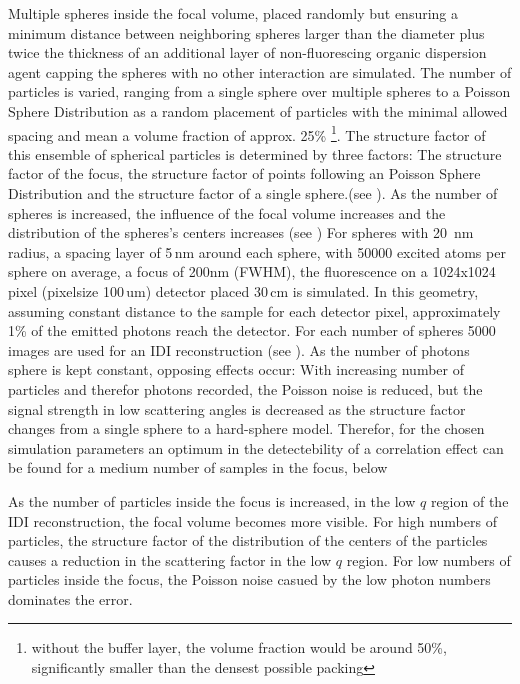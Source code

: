 Multiple spheres inside the focal volume, placed randomly but ensuring a minimum distance between neighboring spheres larger than the diameter plus twice the thickness of an additional layer of non-fluorescing organic dispersion agent capping the spheres with no other interaction are simulated.  The number of particles is varied, ranging from a single sphere over multiple spheres to a Poisson Sphere Distribution as a random placement of particles with the minimal allowed spacing and mean a volume fraction of approx. 25\% \footnote{without the buffer layer, the volume fraction would be around 50\%, significantly smaller than the densest possible packing}. 
The structure factor of this ensemble of spherical particles is determined by three factors: The structure factor of the focus, the structure factor of points following an Poisson Sphere Distribution and the structure factor of a single sphere.(see ). As the number of spheres is increased, the influence of the focal volume increases and the distribution of the spheres's centers increases (see  )
For spheres with 20\, nm radius, a spacing layer of 5\,nm around each sphere, with  50000 excited atoms per sphere on average, a focus of 200nm (FWHM), the fluorescence on a 1024x1024 pixel (pixelsize 100\,um) detector placed 30\,cm is simulated. In this geometry, assuming constant distance to the sample for each detector pixel, approximately 1\% of the emitted photons reach the detector. 
For each number of spheres 5000 images are used for an IDI reconstruction (see  ).
As the number of photons sphere is kept constant, opposing effects occur:  With increasing number of particles and therefor photons recorded, the Poisson noise is reduced, but the signal strength in low scattering angles is decreased as the structure factor changes from a single sphere to a hard-sphere model. Therefor, for the chosen simulation parameters an optimum in the detectebility of a correlation effect can be found for a medium number of samples in the focus, below


As the number of particles inside the focus is increased, in the low $q$ region of the IDI reconstruction, the focal volume becomes more visible. For high numbers of particles, the structure factor of the distribution of the centers of the particles causes a reduction in the scattering factor in the low $q$ region. For low numbers of particles inside the focus, the Poisson noise casued by the low photon numbers dominates the error.


